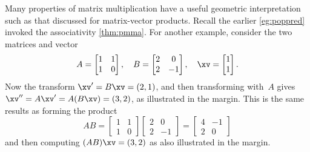 \begin{example}
Many properties of matrix multiplication have a useful geometric interpretation such as that discussed for matrix-vector products.
Recall the earlier \autoref{eg:poppred} invoked the associativity \autoref{thm:pmma}.
For another example, consider the two matrices and vector
\begin{equation*}
A=\begin{bmatrix} 1&1\\1&0 \end{bmatrix},\quad
B=\begin{bmatrix} 2&0\\2&-1 \end{bmatrix},\quad
\xv=\begin{bmatrix} 1\\1 \end{bmatrix}.
\end{equation*}
%
Now the transform \(\xv'=B\xv=(2,1)\), and then transforming with~\(A\) gives \(\xv''=A\xv'=A(B\xv)=(3,2)\), as illustrated in the margin.
This is the same results as forming the product
\begin{equation*}
AB=\begin{bmatrix} 1&1\\1&0 \end{bmatrix} 
\begin{bmatrix} 2&0\\2&-1 \end{bmatrix}
=\begin{bmatrix} 4&-1\\2&0 \end{bmatrix}
\end{equation*}
and then computing \((AB)\xv=(3,2)\) as also illustrated in the margin.
\marginpar{\begin{tikzpicture}
\begin{axis}[footnotesize,width=12em
    , axis equal image, axis lines=middle,
    , grid,xmin=0,xmax=3.9,ymax=2.9 ]

\end{axis}
\end{tikzpicture}}
\end{example}

